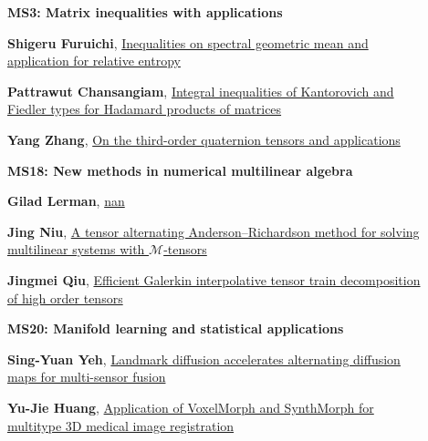 \documentclass[ILAS2025-program.tex]{subfiles}
\begin{document}
\begin{description}
\begin{description}
        \end{description}
    \begin{description}
    \item[] {\color{mstitle}\textbf{MS3: Matrix inequalities with applications}} 
    \item[] \hypertarget{up0144}{}\textbf{Shigeru Furuichi}, \hyperlink{down0144}{Inequalities on spectral geometric mean and application for relative entropy}
        \item[] \hypertarget{up0145}{}\textbf{Pattrawut Chansangiam}, \hyperlink{down0145}{Integral inequalities of Kantorovich and Fiedler types for Hadamard products of matrices}
        \item[] \hypertarget{up0146}{}\textbf{Yang Zhang}, \hyperlink{down0146}{On the third-order quaternion tensors and applications
}
        \end{description}
    \begin{description}
    \item[] {\color{mstitle}\textbf{MS18: New methods in numerical multilinear algebra}} 
    \item[] \hypertarget{up0147}{}\textbf{Gilad Lerman}, \hyperlink{down0147}{nan}
        \item[] \hypertarget{up0148}{}\textbf{Jing Niu}, \hyperlink{down0148}{A tensor alternating Anderson--Richardson method for solving multilinear systems with $ \mathcal{M} $-tensors}
        \item[] \hypertarget{up0149}{}\textbf{Jingmei Qiu}, \hyperlink{down0149}{Efficient Galerkin interpolative tensor train decomposition of high order tensors
}
        \end{description}
    \begin{description}
    \item[] {\color{mstitle}\textbf{MS20: Manifold learning and statistical applications}} 
    \item[] \hypertarget{up0150}{}\textbf{Sing-Yuan Yeh}, \hyperlink{down0150}{Landmark diffusion accelerates alternating diffusion maps for multi-sensor fusion}
        \item[] \hypertarget{up0151}{}\textbf{Yu-Jie Huang}, \hyperlink{down0151}{Application of VoxelMorph and SynthMorph for multitype 3D medical image registration}

\end{description}
\end{description}
\end{document}
